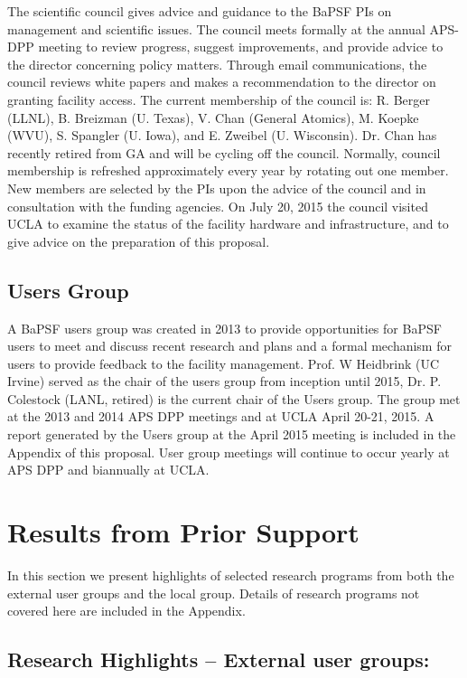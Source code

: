 \documentclass[11pt]{article}
\begin{document}
The scientific council gives advice and guidance to the BaPSF PIs on
management and scientific issues. The council meets formally at the
annual APS-DPP meeting to review progress, suggest improvements, and
provide advice to the director concerning policy matters. Through email
communications, the council reviews white papers and makes a
recommendation to the director on granting facility access. The current
membership of the council is: R. Berger (LLNL), B. Breizman (U. Texas),
V. Chan (General Atomics), M. Koepke (WVU), S. Spangler (U. Iowa), and
E. Zweibel (U. Wisconsin). Dr. Chan has recently retired from GA and
will be cycling off the council. Normally, council membership is
refreshed approximately every year by rotating out one member. New
members are selected by the PIs upon the advice of the council and in
consultation with the funding agencies. On July 20, 2015 the council
visited UCLA to examine the status of the facility hardware and
infrastructure, and to give advice on the preparation of this proposal.


\subsection{Users Group}

A BaPSF users group was created in 2013 to provide opportunities for
BaPSF users to meet and discuss recent research and plans and a formal
mechanism for users to provide feedback to the facility
management. Prof. W Heidbrink (UC Irvine) served as the chair of the
users group from inception until 2015, Dr. P. Colestock (LANL,
retired) is the current chair of the Users group.  The group met at
the 2013 and 2014 APS DPP meetings and at UCLA April 20-21, 2015.  A
report generated by the Users group at the April 2015 meeting is
included in the Appendix of this proposal. User group meetings will
continue to occur yearly at APS DPP and biannually at UCLA.


\section{Results from Prior Support}

In this section we present highlights of selected research programs from
both the external user groups and the local group. Details of research
programs not covered here are included in the Appendix.  

\subsection{Research Highlights -- External user groups:}
\end{document}

